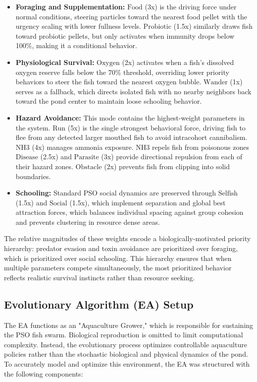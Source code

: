 \documentclass[conference]{IEEEtran}
\begin{document}
\begin{itemize}
    \item \textbf{Foraging and Supplementation:} ${\text{Food}}$ (3x) is the 
    driving force under normal conditions, steering particles toward the nearest food 
    pellet with the urgency scaling with lower
    fullness levels. ${\text{Probiotic}}$ (1.5x) similarly draws fish toward probiotic 
    pellets, but only activates when immunity drops below 100\%, making it a conditional behavior.

    \item \textbf{Physiological Survival:} ${\text{Oxygen}}$ (2x) activates when a 
    fish's dissolved oxygen reserve falls below the 70\% threshold, overriding 
    lower priority behaviors to steer the fish toward the nearest oxygen bubble. 
    ${\text{Wander}}$ (1x) serves as a fallback, which directs isolated fish 
    with no nearby neighbors back toward the pond center to maintain loose schooling behavior.

    \item \textbf{Hazard Avoidance:} This mode contains the highest-weight parameters 
    in the system. ${\text{Run}}$ (5x) is the single strongest behavioral force, 
    driving fish to flee from any detected larger mouthed fish to avoid 
    intracohort cannibalism. ${\text{NH3}}$ (4x) manages ammonia exposure. NH3 repels fish from poisonous
    zones${\text{Disease}}$ (2.5x) and ${\text{Parasite}}$ (3x) 
    provide directional repulsion from each of their hazard zones. 
    ${\text{Obstacle}}$ (2x) prevents fish from clipping into solid boundaries.

    \item \textbf{Schooling:} Standard PSO social dynamics are preserved through 
    ${\text{Selfish}}$ (1.5x) and ${\text{Social}}$ (1.5x), which implement 
    separation and global best attraction forces, which balances individual 
    spacing against group cohesion and prevents clustering in 
    resource dense areas.
\end{itemize}

The relative magnitudes of these weights encode a biologically-motivated priority 
hierarchy: predator evasion and toxin avoidance are prioritized over foraging, which is prioritized over 
social schooling. This hierarchy ensures that when multiple parameters compete 
simultaneously, the most prioritized behavior 
reflects realistic survival instincts rather than resource seeking.
\subsection{Evolutionary Algorithm (EA) Setup}
The EA functions as an "Aquaculture Grower," which is responsible for sustaining the PSO fish swarm. Biological reproduction is omitted to limit computational complexity. Instead, the evolutionary process optimizes controllable aquaculture policies rather than the stochastic biological and physical dynamics of the pond. To accurately model and optimize this environment, the EA was structured with the following components:
\end{document}
